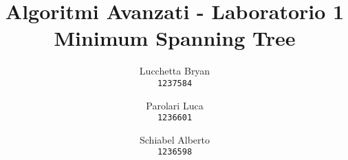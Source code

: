 \author{
  Lucchetta Bryan\\
  \texttt{1237584}
  \and
  Parolari Luca\\
  \texttt{1236601}
  \and
  Schiabel Alberto\\
  \texttt{1236598}
}

\title{Algoritmi Avanzati - Laboratorio 1 \\
  \large Minimum Spanning Tree}

\maketitle

\setcounter{tocdepth}{2}
{
  \hypersetup{linkcolor=black}
  \tableofcontents
}
\protect\pagebreak[2]

